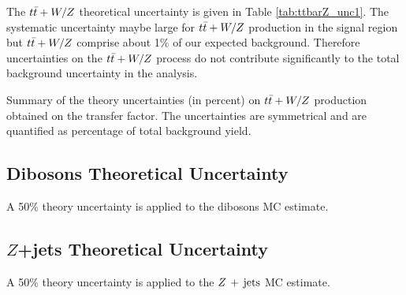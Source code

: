 \indent The $t\bar{t}+W/Z$ theoretical uncertainty is given in Table \ref{tab:ttbarZ_unc1}.  The systematic uncertainty maybe large for $t\bar{t}+W/Z$ production in the signal region but $t\bar{t}+W/Z$ comprise about 1\% of our expected background. Therefore uncertainties on the $t\bar{t}+W/Z$  process do not contribute significantly to the total background uncertainty in the analysis. \\

  \begin{table}[!h]
      \caption{Summary of the theory uncertainties (in percent) on $t\bar{t}+W/Z$ production obtained on the transfer factor. The uncertainties are symmetrical and are quantified as percentage of total background yield.}
    \label{tab:ttbarZ_unc1}
    \begin{center} %
      
    \end{center}
  \end{table}

\subsection{Dibosons Theoretical Uncertainty}

A 50\% theory uncertainty is applied to the dibosons MC estimate.

\subsection{$Z$+jets Theoretical Uncertainty}

A 50\% theory uncertainty is applied to the $Z\,+\,\mathrm{jets}$ MC estimate.



